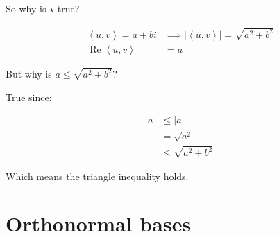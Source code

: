 {{		So why is \(\star\) true?

		\begin{align*}
			\left< u, v \right> = a + bi &\implies \left\lvert \left< u, v \right> \right\rvert = \sqrt{a^{2} + b^{2}} \\
			\operatorname{Re}\left<u, v \right> &= a
		\end{align*}

		But why is \(a \leq \sqrt{a^{2} + b^{2}}\)?

		True since:

		\begin{align*}
			a &\le \left\lvert a \right\rvert \\
			  &= \sqrt{a^{2}} \\
			  &\le \sqrt{a^{2} + b^{2}}
		\end{align*}

		Which means the triangle inequality holds.
	}
}



\section{Orthonormal bases}

